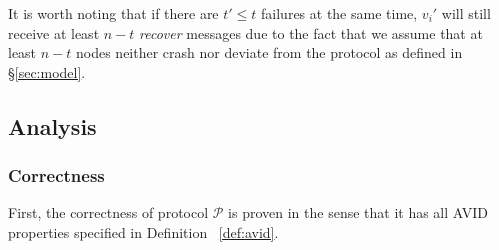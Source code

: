 \documentclass[sigconf,screen]{acmart}
\begin{document}
It is worth noting that if there are $t' \le t$ failures at the same time, $v_i'$ will still receive at least $n-t$ \emph{recover} messages due to the fact that we assume that at least $n-t$ nodes neither crash nor deviate from the protocol as defined in \S\ref{sec:model}.

\subsection{Analysis}
\label{sec:analysis}

\subsubsection{Correctness}

First, the correctness of protocol $\mathcal{P}$ is proven in the sense that it has all AVID properties specified in Definition~
\ref{def:avid}.
\end{document}
